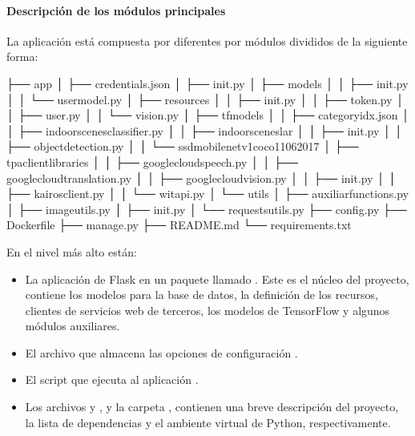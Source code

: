 \paragraph{Descripción de los módulos principales}
\label{\detokenize{chapter_two/desc_cloudnao:codigo}}
La aplicación está compuesta por diferentes por módulos
divididos de la siguiente forma:

\begin{sphinxVerbatim}[commandchars=\\\{\}]
├── app
│   ├── credentials.json
│   ├── \PYGZus{}\PYGZus{}init\PYGZus{}\PYGZus{}.py
│   ├── models
│   │   ├── \PYGZus{}\PYGZus{}init\PYGZus{}\PYGZus{}.py
│   │   └── user\PYGZus{}model.py
│   ├── resources
│   │   ├── \PYGZus{}\PYGZus{}init\PYGZus{}\PYGZus{}.py
│   │   ├── token.py
│   │   ├── user.py
│   │   └── vision.py
│   ├── tf\PYGZus{}models
│   │   ├── category\PYGZus{}idx.json
│   │   ├── indoor\PYGZus{}scenes\PYGZus{}classifier.py
│   │   ├── indoor\PYGZus{}scenes\PYGZus{}lar
│   │   ├── \PYGZus{}\PYGZus{}init\PYGZus{}\PYGZus{}.py
│   │   ├── object\PYGZus{}detection.py
│   │   └── ssd\PYGZus{}mobilenet\PYGZus{}v1\PYGZus{}coco\PYGZus{}11\PYGZus{}06\PYGZus{}2017
│   ├── tpa\PYGZus{}client\PYGZus{}libraries
│   │   ├── google\PYGZus{}cloud\PYGZus{}speech.py
│   │   ├── google\PYGZus{}cloud\PYGZus{}translation.py
│   │   ├── google\PYGZus{}cloud\PYGZus{}vision.py
│   │   ├── \PYGZus{}\PYGZus{}init\PYGZus{}\PYGZus{}.py
│   │   ├── kairos\PYGZus{}client.py
│   │   └── wit\PYGZus{}api.py
│   └── utils
│       ├── auxiliar\PYGZus{}functions.py
│       ├── image\PYGZus{}utils.py
│       ├── \PYGZus{}\PYGZus{}init\PYGZus{}\PYGZus{}.py
│       └── requests\PYGZus{}utils.py
├── config.py
├── Dockerfile
├── manage.py
├── README.md
└── requirements.txt
\end{sphinxVerbatim}

En el nivel más alto están:
\begin{itemize}
\item {} 
La aplicación de Flask en un paquete llamado . Este es el núcleo del proyecto, contiene los modelos para la base de datos, la definición de los recursos, clientes de servicios web de terceros, los modelos de TensorFlow
y algunos módulos auxiliares.

\item {} 
El archivo que almacena las opciones de configuración .

\item {} 
El script que ejecuta al aplicación .

\item {} 
Los archivos  y , y la carpeta , contienen una breve descripción del proyecto, la lista de dependencias y el ambiente virtual de Python, respectivamente.

\end{itemize}

